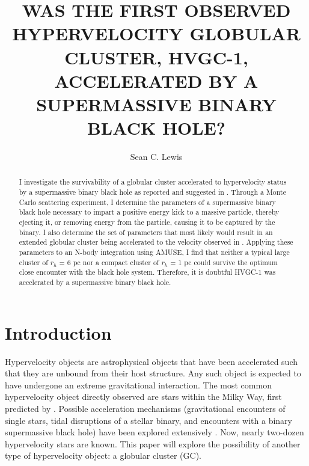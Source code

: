 \documentclass{aastex62}
\begin{document}
\title{WAS THE FIRST OBSERVED HYPERVELOCITY GLOBULAR CLUSTER, HVGC-1, ACCELERATED BY A SUPERMASSIVE BINARY BLACK HOLE?}

\author{Sean C. Lewis}



\begin{abstract}
I investigate the survivability of a globular cluster accelerated to hypervelocity status by a supermassive binary black hole as reported and suggested in \citet{cald14}. Through a Monte Carlo scattering experiment, I determine the parameters of a supermassive binary black hole necessary to impart a positive energy kick to a massive particle, thereby ejecting it, or removing energy from the particle, causing it to be captured by the binary. I also determine the set of parameters that most likely would result in an extended globular cluster being accelerated to the velocity observed in \citet{cald14}. Applying these parameters to an N-body integration using AMUSE, I find that neither a typical large cluster of  $r_{h}$ = 6 pc nor a compact cluster of $r_{h}$ = 1 pc could survive the optimum close encounter with the black hole system. Therefore, it is doubtful HVGC-1 was accelerated by a supermassive binary black hole.

\end{abstract}
\section{Introduction} \label{sec:intro}
Hypervelocity objects are astrophysical objects that have been accelerated such that they are unbound from their host structure. Any such object is expected to have undergone an extreme gravitational interaction. The most common hypervelocity object directly observed are stars within the Milky Way, first predicted by \citet{hill88}.  Possible acceleration mechanisms (gravitational encounters of single stars, tidal disruptions of a stellar binary, and encounters with a binary supermassive black hole) have been explored extensively \citep{yutre03}. Now, nearly two-dozen hypervelocity stars are known. This paper will explore the possibility of another type of hypervelocity object: a globular cluster (GC). 
\end{document}
